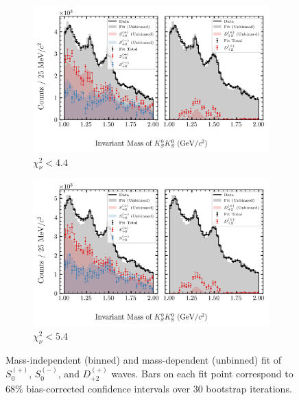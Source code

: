 \begin{figure}[htbp]
    \begin{subfigure}{0.45\textwidth}
        \includegraphics[width=\linewidth]{figures/binned_and_unbinned_fit_chisqdof_4.4_splot_D_1s_2b_phase_factor_waves29099_uncertainty_bootstrap-SE.png}
        \caption{$\chi^2_\nu < 4.4$}
    \end{subfigure}
    \hfill
    \begin{subfigure}{0.45\textwidth}
        \includegraphics[width=\linewidth]{figures/binned_and_unbinned_fit_chisqdof_5.4_splot_D_1s_2b_phase_factor_waves29099_uncertainty_bootstrap-SE.png}
        \caption{$\chi^2_\nu < 5.4$}
    \end{subfigure}

    \caption{Mass-independent (binned) and mass-dependent (unbinned) fit of $S_{0}^{(+)}$, $S_{0}^{(-)}$, and $D_{+2}^{(+)}$ waves. Bars on each fit point correspond to $68\%$ bias-corrected confidence intervals over $ 30 $ bootstrap iterations.}
    \label{fig:unbinned-fit-all-Spn-D2p}
\end{figure}

